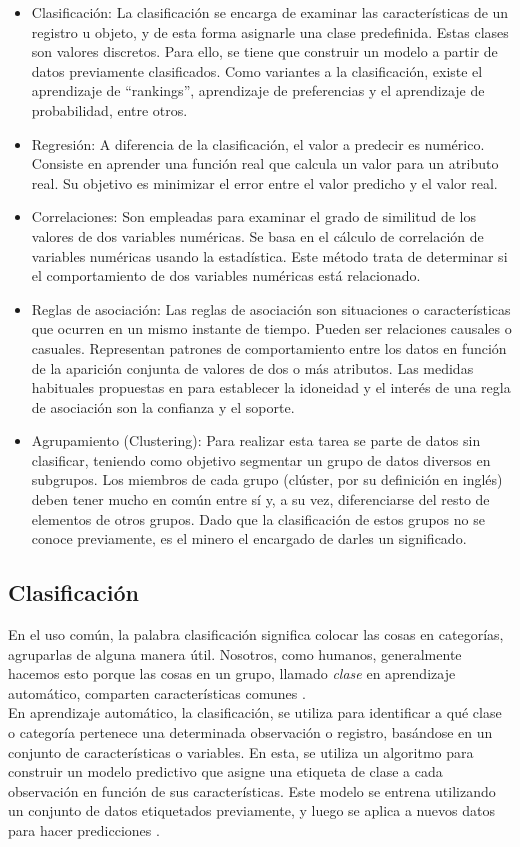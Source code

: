 \begin{itemize}
	\item Clasificación: La clasificación se encarga de examinar las características de un registro u objeto, y de esta forma asignarle una clase predefinida. Estas clases son valores discretos. Para ello, se tiene que construir un modelo a partir de datos previamente clasificados. Como variantes a la clasificación, existe el aprendizaje de “rankings”, aprendizaje de preferencias y el aprendizaje de probabilidad, entre otros. 
	\item Regresión: A diferencia de la clasificación, el valor a predecir es numérico. Consiste en aprender una función real que calcula un valor para un atributo real. Su objetivo es minimizar el error entre el valor predicho y el valor real.
	\item  Correlaciones: Son empleadas para examinar el grado de similitud de los valores de dos variables numéricas. Se basa en el cálculo de correlación de variables numéricas usando la estadística. Este método trata de determinar si el comportamiento de dos variables numéricas está relacionado.
	\item Reglas de asociación: Las reglas de asociación son situaciones o características que ocurren en un mismo instante de tiempo. Pueden ser relaciones causales o casuales. Representan patrones de comportamiento entre los datos en función de la aparición conjunta de valores de dos o más atributos. Las medidas habituales propuestas en \citep{Agrawal1519}	para establecer la idoneidad y el interés de una regla de asociación son la confianza y el soporte.
	\item	Agrupamiento (Clustering): Para realizar esta tarea se parte de datos sin clasificar, teniendo como objetivo segmentar un grupo de datos diversos en subgrupos. Los miembros de cada grupo (clúster, por su definición en inglés) deben tener mucho en común entre sí y, a su vez, diferenciarse del resto de elementos de otros grupos. Dado que la clasificación de estos grupos no se conoce previamente, es el minero el encargado de darles un significado.
\end{itemize}

\subsection{Clasificación}
En el uso común, la palabra clasificación significa colocar las cosas en categorías, agruparlas de alguna manera útil. Nosotros, como humanos, generalmente hacemos esto porque las cosas en un grupo, llamado \textit{clase} en aprendizaje automático, comparten características comunes \citep{sammut2011encyclopedia}. \\
En aprendizaje automático, la clasificación, se utiliza para identificar a qué clase o categoría pertenece una determinada observación o registro, basándose en un conjunto de características o variables. En esta, se utiliza un algoritmo para construir un modelo predictivo que asigne una etiqueta de clase a cada observación en función de sus características. Este modelo se entrena utilizando un conjunto de datos etiquetados previamente, y luego se aplica a nuevos datos para hacer predicciones \citep{sammut2011encyclopedia}.


